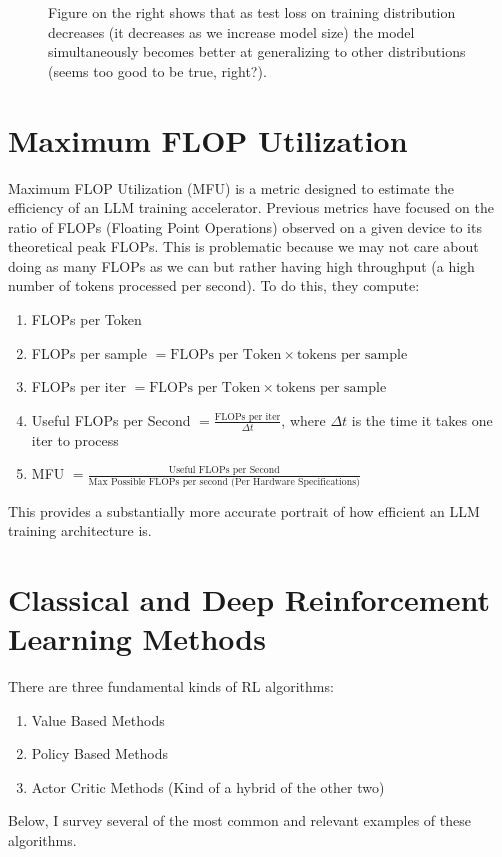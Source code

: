 \documentclass[12pt]{article}
\begin{document}
\begin{itemize}
\begin{figure}[H]
	\caption{Figure on the right shows that as test loss on training distribution decreases (it decreases as we increase model size) the model simultaneously becomes better at generalizing to other distributions (seems too good to be true, right?).}
\end{figure}
\end{itemize}

\section{Maximum FLOP Utilization}
Maximum FLOP Utilization (MFU) is a metric designed to estimate the efficiency of an LLM training accelerator. Previous metrics have focused on the ratio of FLOPs (Floating Point Operations) observed on a given device to its theoretical peak FLOPs. This is problematic because we may not care about doing as many FLOPs as we can but rather having high throughput (a high number of tokens processed per second). To do this, they compute:
\begin{enumerate}
    \item FLOPs per Token
    \item FLOPs per sample \(= \text{FLOPs per Token} \times \text{tokens per sample}\)
    \item FLOPs per iter \(= \text{FLOPs per Token} \times \text{tokens per sample}\)
    \item Useful FLOPs per Second \(= \frac{\text{FLOPs per iter}}{\Delta t}\), where \(\Delta t\) is the time it takes one iter to process
    \item MFU \(= \frac{\text{Useful FLOPs per Second}}{\text{Max Possible FLOPs per second (Per Hardware Specifications)}}\)
\end{enumerate}
This provides a substantially more accurate portrait of how efficient an LLM training architecture is. 

\section{Classical and Deep Reinforcement Learning Methods}
There are three fundamental kinds of RL algorithms:
\begin{enumerate}
\item Value Based Methods
\item Policy Based Methods
\item Actor Critic Methods (Kind of a hybrid of the other two)
\end{enumerate}
Below, I survey several of the most common and relevant examples of these algorithms.\\
\end{document}
